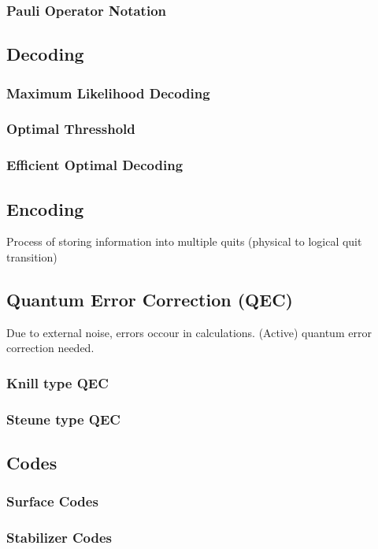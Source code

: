 \documentclass{article}
\begin{document}
\subsubsection{Pauli Operator Notation}


\subsection{Decoding}

\subsubsection{Maximum Likelihood Decoding}
\subsubsection{Optimal Thresshold}

\subsubsection{Efficient Optimal Decoding}

\subsection{Encoding}
Process of storing information into multiple quits (physical to logical quit transition)

\subsection{Quantum Error Correction (QEC)}
Due to external noise, errors occour in calculations. (Active) quantum error correction needed.
\subsubsection{Knill type QEC}
\subsubsection{Steune type QEC}

\subsection{Codes}
\subsubsection{Surface Codes}
\subsubsection{Stabilizer Codes}
\end{document}
